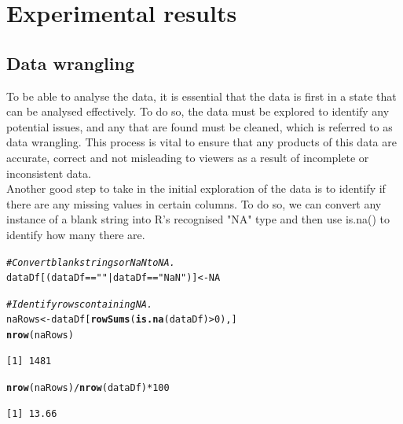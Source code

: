 \documentclass[12pt]{report}\usepackage[]{graphicx}\usepackage[]{xcolor}
\makeatletter
\newcommand{\hlnum}[1]{\textcolor[rgb]{0.686,0.059,0.569}{#1}}%
\newcommand{\hlstr}[1]{\textcolor[rgb]{0.192,0.494,0.8}{#1}}%
\newcommand{\hlcom}[1]{\textcolor[rgb]{0.678,0.584,0.686}{\textit{#1}}}%
\newcommand{\hlopt}[1]{\textcolor[rgb]{0,0,0}{#1}}%
\newcommand{\hlstd}[1]{\textcolor[rgb]{0.345,0.345,0.345}{#1}}%
\newcommand{\hlkwb}[1]{\textcolor[rgb]{0.69,0.353,0.396}{#1}}%
\newcommand{\hlkwd}[1]{\textcolor[rgb]{0.737,0.353,0.396}{\textbf{#1}}}%
\newenvironment{kframe}{%
 \def\at@end@of@kframe{}%
 \ifinner\ifhmode%
  \def\at@end@of@kframe{\end{minipage}}%
  \begin{minipage}{\columnwidth}%
 \fi\fi%
 \def\FrameCommand##1{\hskip\@totalleftmargin \hskip-\fboxsep
 \colorbox{shadecolor}{##1}\hskip-\fboxsep
     \hskip-\linewidth \hskip-\@totalleftmargin \hskip\columnwidth}%
 \MakeFramed {\advance\hsize-\width
   \@totalleftmargin\z@ \linewidth\hsize
   \@setminipage}}%
 {\par\unskip\endMakeFramed%
 \at@end@of@kframe}
\newenvironment{knitrout}{}{} %
\makeatother
\begin{document}
\pagebreak

\chapter{Experimental results}




\section{Data wrangling}
To be able to analyse the data, it is essential that the data is first in a state that
can be analysed effectively. To do so, the data must be explored to identify any potential
issues, and any that are found must be cleaned, which is referred to as data wrangling. This 
process is vital to ensure that any products of this data are accurate, correct and not misleading
to viewers as a result of incomplete or inconsistent data.\\

\noindent Another good step to take in the initial exploration of the data is to identify if there are any missing values
in certain columns. To do so, we can convert any instance of a blank string into R's recognised "NA" type and
then use is.na() to identify how many there are.

\begin{knitrout}
\color{fgcolor}\begin{kframe}
\begin{alltt}
\hlcom{# Convert blank strings or NaN to NA.}
\hlstd{dataDf[(dataDf} \hlopt{==} \hlstr{""} \hlopt{|} \hlstd{dataDf} \hlopt{==} \hlstr{"NaN"}\hlstd{)]} \hlkwb{<-} \hlnum{NA}

\hlcom{# Identify rows containing NA.}
\hlstd{naRows} \hlkwb{<-} \hlstd{dataDf[}\hlkwd{rowSums}\hlstd{(}\hlkwd{is.na}\hlstd{(dataDf)} \hlopt{>} \hlnum{0}\hlstd{),]}
\hlkwd{nrow}\hlstd{(naRows)}
\end{alltt}
\begin{verbatim}
[1] 1481
\end{verbatim}
\begin{alltt}
\hlkwd{nrow}\hlstd{(naRows)}\hlopt{/}\hlkwd{nrow}\hlstd{(dataDf)}\hlopt{*}\hlnum{100}
\end{alltt}
\begin{verbatim}
[1] 13.66
\end{verbatim}
\end{kframe}
\end{knitrout}
\end{document}
